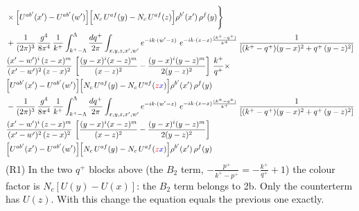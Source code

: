\documentclass[9pt]{article}
\numberwithin{equation}{section}
\begin{document}
\begin{align}
&\times\Big[U^{ab'}(x')-U^{ab'}(w')\Big]\Big[N_{c}\,U^{af}(y)-N_{c}\,U^{af}(z)\Big]\rho^{b'}(x')\,\rho^{f}(y)\Bigg\}\notag \\ &  + \frac{1}{(2\pi)^{3}}\,\frac{g^{4}}{8\pi^{4}}\,\frac{1}{k^{+}}\int_{k^{+}-\Lambda}^{\Lambda}\frac{dq^{+}}{2\pi}\int_{x,y,z,x',w'}e^{-ik\cdot(w'-z)}\ e^{-ik\cdot(z-x)\frac{(k^{+}-q^{+})}{k^{+}}}\,\frac{1}{\left[(k^{+}-q^{+})(y-x)^{2}+q^{+}\,(y-z)^{2}\right]}\notag \\ & \frac{(x'-w')^{i}\,(z-x)^{m}}{(x'-w')^{2}\,(z-x)^{2}}\,\left[\frac{(y-x)^{i}(x-z)^{m}}{(x-z)^{2}}-\frac{(y-x)^{i}(y-z)^{m}}{2(y-z)^{2}}\right]\,\frac{k^{+}}{q^{+}}\times\notag \\ & \Big[U^{ab'}(x')-U^{ab'}(w')\Big]\Big[N_{c}\,U^{af}(y)-N_{c}\,U^{af}({\color{red}z}{\color{blue}x})\Big]\rho^{b'}(x')\,\rho^{f}(y)\notag \\ & - \frac{1}{(2\pi)^{3}}\,\frac{g^{4}}{8\pi^{4}}\,\frac{1}{k^{+}}\int_{k^{+}-\Lambda}^{\Lambda}\frac{dq^{+}}{2\pi}\int_{x,y,z,x',w'}e^{-ik\cdot(w'-z)}\ e^{-ik\cdot(z-x)\frac{(k^{+}-q^{+})}{k^{+}}}\,\frac{1}{\left[(k^{+}-q^{+})(y-x)^{2}+q^{+}\,(y-z)^{2}\right]}\notag \\ & \frac{(x'-w')^{i}\,(z-x)^{m}}{(x'-w')^{2}\,(z-x)^{2}}\,\left[\frac{(y-x)^{i}(x-z)^{m}}{(x-z)^{2}}-\frac{(y-x)^{i}(y-z)^{m}}{2(y-z)^{2}}\right]\notag \\ & \Big[U^{ab'}(x')-U^{ab'}(w')\Big]\Big[N_{c}\,U^{af}(y)-N_{c}\,U^{af}({\color{red}z}{\color{blue}x})\Big]\rho^{b'}(x')\,\rho^{f}(y)
\end{align}
{\color{blue}(R1) In the two $q^{+}$ blocks above (the $B_{2}$ term, $-\frac{p^{+}}{k^{+}-p^{+}}=-\frac{k^{+}}{q^{+}}+1$) the colour factor is $N_{c}[U(y)-U(x)]$: the $B_{2}$ term belongs to 2b. Only the counterterm has $U(z)$. With this change the equation equals the previous one exactly.}
\end{document}
